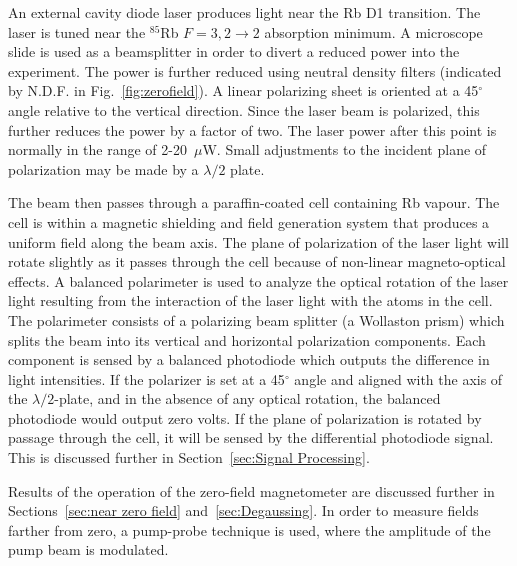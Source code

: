 An external cavity diode laser produces light near the Rb D1
transition.  The laser is tuned near the $^{85}$Rb $F=3,2\rightarrow
2$ absorption minimum.  A microscope slide is used as a beamsplitter
in order to divert a reduced power into the experiment.  The power is
further reduced using neutral density filters (indicated by N.D.F. in
Fig.~\ref{fig:zerofield}).  A linear polarizing sheet is oriented at a
45$^\circ$ angle relative to the vertical direction.  Since the laser
beam is polarized, this further reduces the power by a factor of
two. The laser power after this point is normally in the range of
2-20~$\mu$W.  Small adjustments to the incident plane of polarization
may be made by a $\lambda/2$ plate.

The beam then passes through a paraffin-coated cell containing Rb
vapour.  The cell is within a magnetic shielding and field generation
system that produces a uniform field along the beam axis.  The plane
of polarization of the laser light will rotate slightly as it passes
through the cell because of non-linear magneto-optical effects.  A
balanced polarimeter is used to analyze the optical rotation of the
laser light resulting from the interaction of the laser light with the
atoms in the cell.  The polarimeter consists of a polarizing beam
splitter (a Wollaston prism) which splits the beam into its vertical
and horizontal polarization components.  Each component is sensed by a
balanced photodiode which outputs the difference in light intensities.
If the polarizer is set at a 45$^\circ$ angle and aligned with the
axis of the $\lambda/2$-plate, and in the absence of any optical
rotation, the balanced photodiode would output zero volts.  If the
plane of polarization is rotated by passage through the cell, it will
be sensed by the differential photodiode signal.  This is discussed
further in Section~\ref{sec:Signal Processing}.

Results of the operation of the zero-field magnetometer are discussed
further in Sections~\ref{sec:near zero field}
and~\ref{sec:Degaussing}.  In order to measure fields
farther from zero, a pump-probe technique is used, where the amplitude
of the pump beam is modulated.

